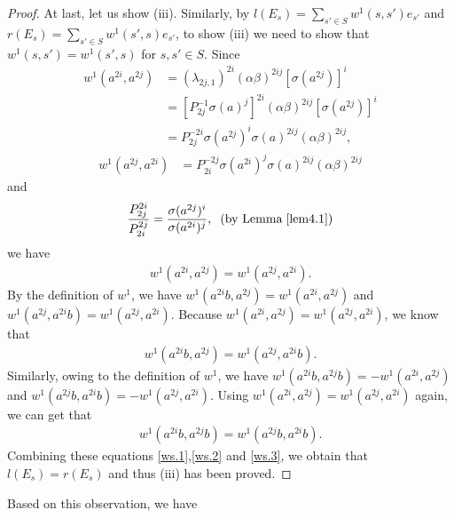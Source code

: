 \documentclass[a4paper,11pt]{amsart}
\numberwithin{equation}{section}
\begin{document}
\begin{proof}
 At last, let us show (iii). Similarly, by $l(E_s)=\sum_{s'\in S} w^1(s,s')e_{s'}$ and $r(E_s)=\sum_{s'\in S} w^1(s',s)e_{s'}$, to show (iii) we need to show that $w^1(s,s')=w^1(s',s)$ for $s,s' \in S.$  Since
\begin{align*}
w^1(a^{2i},a^{2j})&=(\lambda_{2j,1})^{2i}(\alpha\beta)^{2ij}[\sigma(a^{2j})]^i\\
&=[P_{2j}^{-1} \sigma(a)^j]^{2i}(\alpha\beta)^{2ij}[\sigma(a^{2j})]^i\\
&=P_{2j}^{-2i} \sigma(a^{2j})^i \sigma(a)^{2ij}(\alpha\beta)^{2ij},
\end{align*}
\begin{align*}
w^1(a^{2j},a^{2i})&=P_{2i}^{-2j} \sigma(a^{2i})^j \sigma(a)^{2ij}(\alpha\beta)^{2ij}
\end{align*}
and
\begin{align*}
\frac{P_{2j}^{2i}}{P_{2i}^{2j}}=\frac{\sigma(a^{2j})^i}{\sigma(a^{2i})^j},\;\;(\text{by Lemma}\;\ref{lem4.1})
\end{align*}
we have
\begin{align}
\label{ws.1} w^1(a^{2i},a^{2j})=w^1(a^{2j},a^{2i}).
\end{align}
By the definition of $w^1$, we have $w^1(a^{2i}b,a^{2j})=w^1(a^{2i},a^{2j})$ and $w^1(a^{2j},a^{2i}b)=w^1(a^{2j},a^{2i})$. Because $w^1(a^{2i},a^{2j})=w^1(a^{2j},a^{2i})$, we know that
\begin{align}
\label{ws.2} w^1(a^{2i}b,a^{2j})=w^1(a^{2j},a^{2i}b).
\end{align}
Similarly, owing to the definition of $w^1$, we have $w^1(a^{2i}b,a^{2j}b)=-w^1(a^{2i},a^{2j})$ and $w^1(a^{2j}b,a^{2i}b)=-w^1(a^{2j},a^{2i})$. Using $w^1(a^{2i},a^{2j})=w^1(a^{2j},a^{2i})$ again, we can get that
\begin{align}
\label{ws.3} w^1(a^{2i}b,a^{2j}b)=w^1(a^{2j}b,a^{2i}b).
\end{align}
Combining these equations \eqref{ws.1},\eqref{ws.2} and \eqref{ws.3}, we obtain that $l(E_s)=r(E_s)$ and thus (iii) has been proved.
\end{proof}

Based on this observation, we have
\end{document}
